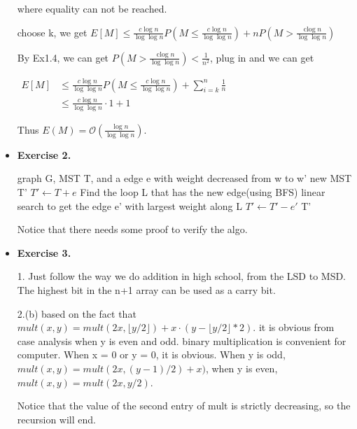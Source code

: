 \documentclass{article}
\begin{document}
\begin{itemize}
where equality can not be reached.

choose k, we get $E[M] \leq \frac{c \log n}{\log \log n} P\left(M \leq \frac{c \log n}{\log \log n}\right)+n P\left(M>\frac{\operatorname{clog} n}{\log \log n}\right)$

By Ex1.4, we can get $P\left(M>\frac{\operatorname{clog} n}{\log \log n}\right)<\frac{1}{n^{2}}$, plug in and we can get

$\begin{aligned} E[M] & \leq \frac{c \log n}{\log \log n} P\left(M \leq \frac{c \log n}{\log \log n}\right)+ \sum_{i=k}^{n} \frac{1}{n} \\ & \leq \frac{c \log n}{\log \log n} \cdot 1+1 \end{aligned}$

Thus $E(M)=\mathcal{O}\left(\frac{\log n}{\log \log n}\right)$.

\item \textbf{Exercise 2.}

\begin{algorithm}[H]  
    \caption{$MST_{renew}$}  
    \begin{algorithmic}[1]  
        \Require graph G, MST T, and a edge e with weight decreased from w to w'
        \Ensure new MST T'
            \State $T' \gets T + e$
            \State Find the loop L that has the new edge(using BFS)
            \State linear search to get the edge e' with largest weight along L
            \State $T'\gets T' - e'$
        \State \Return T'
    \end{algorithmic}  
\end{algorithm}

Notice that there needs some proof to verify the algo.

\item \textbf{Exercise 3.}

1. Just follow the way we do addition in high school, from the LSD to MSD. The highest bit in the n+1 array can be used as a carry bit.

2.(b) based on the fact that $mult(x,y) = mult(2x, \lfloor{y/2}\rfloor) + x\cdot (y-\lfloor{y/2}\rfloor*2) $. it is obvious from case analysis when y is even and odd. binary multiplication is convenient for computer. When x = 0 or y = 0, it is obvious. When y is odd, $mult(x,y) = mult(2x, (y-1)/2) + x) $, when y is even, $mult(x,y) = mult(2x, y/2) $.

Notice that the value of the second entry of mult is strictly decreasing, so the recursion will end.


\end{itemize}
\end{document}
